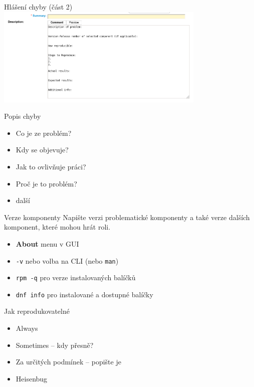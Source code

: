 \documentclass[12pt,aspectratio=169]{beamer}
\begin{document}
\begin{frame}{Hlášení chyby (část 2)}
\includegraphics[width=10cm]{images/bz_description.png}
\end{frame}

\begin{frame}{Popis chyby}
\begin{itemize}
	\item Co je ze problém?
	\item Kdy se objevuje?
	\item Jak to ovlivňuje práci?
	\item Proč je to problém?
	\item další
\end{itemize}
\end{frame}

\begin{frame}[fragile]{Verze komponenty}
Napište verzi problematické komponenty a také verze dalších komponent, které mohou hrát roli.
\begin{itemize}
	\item {\color{blue}\textbf{About}} menu v GUI
	\item {\color{blue}\texttt{-v}} nebo {\color{blue}{\verb|--version|}} volba na CLI (nebo \texttt{man})
	\item {\color{blue}\texttt{rpm -q}} pro verze instalovaných balíčků
	\item {\color{blue}\texttt{dnf info}} pro instalované a dostupné balíčky
\end{itemize}
\end{frame}

\begin{frame}{Jak reprodukovatelné}
\begin{itemize}
	\item Always
	\item Sometimes -- kdy přesně?
	\item Za určitých podmínek -- popište je
	\item Heisenbug 
\end{itemize}
\end{frame}
\end{document}
